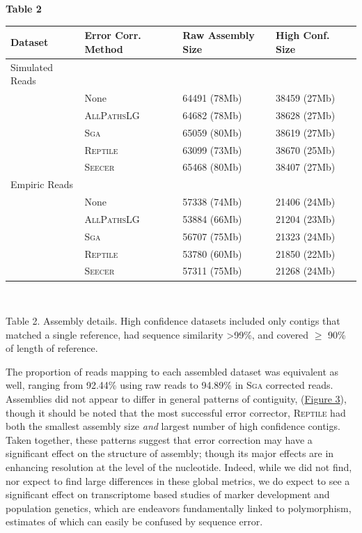 \documentclass[11pt]{article}
\begin{document}
\noindent
\textbf{\hypertarget{Table 2}{Table 2}} \\
\begin{center}
    \begin{tabular}{ | l | l | l  | l | l |}
    \hline
    Dataset & Error Corr. Method &  Raw Assembly Size & High Conf. Size  \\ \hline
    Simulated Reads & & & \\ \hline
     & None & 64491 (78Mb)&38459 (27Mb)  \\ \hline
     & \textsc{AllPathsLG} &64682 (78Mb) & 38628 (27Mb) \\ \hline
     & \textsc{Sga} &65059 (80Mb) & 38619 (27Mb)\\ \hline
     & \textsc{Reptile} &63099 (73Mb) &38670 (25Mb)  \\ \hline
     & \textsc{Seecer} &65468 (80Mb) & 38407 (27Mb) \\ \hline
Empiric Reads & & & \\ \hline
     & None &57338 (74Mb) & 21406 (24Mb)\\ \hline
     & \textsc{AllPathsLG} &53884 (66Mb) & 21204 (23Mb)\\ \hline
     & \textsc{Sga} &56707 (75Mb) & 21323 (24Mb) \\ \hline
     & \textsc{Reptile} &53780 (60Mb) & 21850 (22Mb)\\ \hline
     & \textsc{Seecer} &57311 (75Mb) & 21268 (24Mb) \\ \hline

  \end{tabular}
\\
\end{center}
\noindent
\begin{changemargin}{2cm}{2cm}
Table 2. Assembly details. High confidence datasets included only contigs that matched a single reference, had sequence similarity \textgreater 99\%, and covered $\geq$ 90\% of length of reference. 
\end{changemargin}

\vspace{10mm}
\noindent
The proportion of reads mapping to each assembled dataset was equivalent as well, ranging from 92.44\% using raw reads to 94.89\% in \textsc{Sga} corrected reads.  Assemblies did not appear to differ in general patterns of contiguity,  (\hyperlink{Figure 3}{Figure 3}), though it should be noted that the most successful error corrector, \textsc{Reptile} had both the smallest assembly size \textit{and} largest number of high confidence contigs.  Taken together, these patterns suggest that error correction may have a significant effect on the structure of assembly; though its major effects are in enhancing resolution at the level of the nucleotide. Indeed, while we did not find, nor expect to find large differences in these global metrics, we do expect to see a significant effect on transcriptome based studies of marker development and population genetics, which are endeavors fundamentally linked to polymorphism, estimates of which can easily be confused by sequence error.    \\
 
\end{document}
